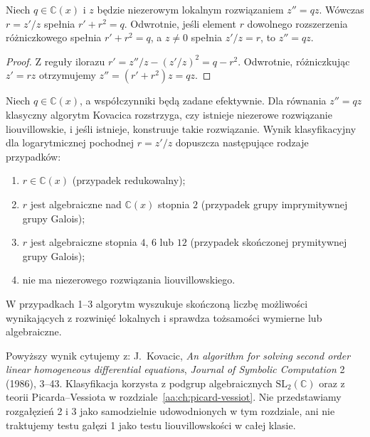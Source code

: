 \begin{lemat}
\label{aa:lem:kovacic-riccati}
Niech $q\in\mathbb C(x)$ i
$z$ będzie niezerowym
lokalnym rozwiązaniem
$z''=qz$. Wówczas
$r=z'/z$ spełnia
$r'+r^2=q$.
Odwrotnie, jeśli element
$r$ dowolnego rozszerzenia
różniczkowego spełnia
$r'+r^2=q$, a
$z\ne0$ spełnia $z'/z=r$,
to $z''=qz$.
\end{lemat}
\begin{proof}
Z reguły ilorazu
$r'=z''/z-(z'/z)^2
=q-r^2$.
Odwrotnie, różniczkując
$z'=rz$ otrzymujemy
$z''=(r'+r^2)z=qz$.
\end{proof}

\begin{twierdzenie}
\label{aa:tw:kovacic-classification}
Niech $q\in\mathbb C(x)$,
a współczynniki będą zadane
efektywnie. Dla równania
$z''=qz$ klasyczny algorytm
Kovacica rozstrzyga, czy istnieje
niezerowe rozwiązanie
liouvillowskie, i jeśli istnieje,
konstruuje takie rozwiązanie.
Wynik klasyfikacyjny dla
logarytmicznej pochodnej
$r=z'/z$ dopuszcza następujące
rodzaje przypadków:
\begin{enumerate}
\item $r\in\mathbb C(x)$
(przypadek redukowalny);
\item $r$ jest algebraiczne
nad $\mathbb C(x)$ stopnia
$2$ (przypadek grupy imprymitywnej
grupy Galois);
\item $r$ jest algebraiczne
stopnia $4$, $6$ lub $12$
(przypadek skończonej
prymitywnej grupy Galois);
\item nie ma niezerowego
rozwiązania liouvillowskiego.
\end{enumerate}
W przypadkach 1--3
algorytm wyszukuje skończoną
liczbę możliwości wynikających
z rozwinięć lokalnych
i sprawdza tożsamości
wymierne lub algebraiczne.
\end{twierdzenie}

\begin{uwaga}
\label{aa:uw:kovacic-citation}
Powyższy wynik cytujemy z:
J.~Kovacic, \emph{An algorithm
for solving second order linear
homogeneous differential equations},
\emph{Journal of Symbolic Computation}
2 (1986), 3--43.
Klasyfikacja korzysta z
podgrup algebraicznych
$\mathrm{SL}_2(\mathbb C)$
oraz z teorii Picarda--Vessiota
w rozdziale~\ref{aa:ch:picard-vessiot}.
Nie przedstawiamy rozgałęzień
2 i 3 jako samodzielnie
udowodnionych w tym rozdziale,
ani nie traktujemy testu
gałęzi 1 jako testu
liouvillowskości w całej klasie.
\end{uwaga}

